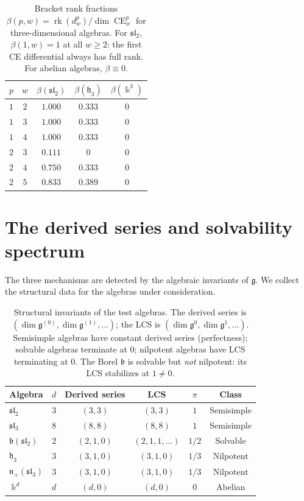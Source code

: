 \documentclass[11pt,reqno]{amsart}
\theoremstyle{plain}
\theoremstyle{definition}
\theoremstyle{remark}
\DeclareMathOperator{\CE}{CE}
\DeclareMathOperator{\rk}{rk}
\newcommand{\fg}{\mathfrak{g}}
\newcommand{\fh}{\mathfrak{h}}
\newcommand{\fn}{\mathfrak{n}}
\newcommand{\fb}{\mathfrak{b}}
\newcommand{\kk}{\Bbbk}
\begin{document}
\begin{table}[ht]
 \centering
 \begin{tabular}{cc|ccc}
 \toprule
 $p$ & $w$ & $\beta(\mathfrak{sl}_2)$ & $\beta(\fh_3)$ & $\beta(\kk^3)$ \\
 \midrule
 $1$ & $2$ & $1.000$ & $0.333$ & $0$ \\
 $1$ & $3$ & $1.000$ & $0.333$ & $0$ \\
 $1$ & $4$ & $1.000$ & $0.333$ & $0$ \\
 $2$ & $3$ & $0.111$ & $0$ & $0$ \\
 $2$ & $4$ & $0.750$ & $0.333$ & $0$ \\
 $2$ & $5$ & $0.833$ & $0.389$ & $0$ \\
 \bottomrule
 \end{tabular}
 \caption{Bracket rank fractions $\beta(p, w) = \rk(d^p_w)/\dim \CE^p_w$ for
 three-dimensional algebras. For $\mathfrak{sl}_2$, $\beta(1, w) = 1$ at
 all $w \ge 2$: the first CE differential always has full rank. For
 abelian algebras, $\beta \equiv 0$.}
 \label{tab:rank-fractions}
\end{table}


\section{The derived series and solvability spectrum}
\label{sec:derived}

The three mechanisms are detected by the algebraic invariants of $\fg$. We
collect the structural data for the algebras under consideration.

\begin{table}[ht]
 \centering
 \begin{tabular}{lccccc}
 \toprule
 Algebra & $d$ & Derived series & LCS & $\pi$ & Class \\
 \midrule
 $\mathfrak{sl}_2$ & $3$ & $(3, 3)$ & $(3, 3)$ & $1$ & Semisimple \\
 $\mathfrak{sl}_3$ & $8$ & $(8, 8)$ & $(8, 8)$ & $1$ & Semisimple \\
 $\fb(\mathfrak{sl}_2)$ & $2$ & $(2, 1, 0)$ & $(2, 1, 1, \ldots)$ & $1/2$
 & Solvable \\
 $\fh_3$ & $3$ & $(3, 1, 0)$ & $(3, 1, 0)$ & $1/3$ & Nilpotent \\
 $\fn_+(\mathfrak{sl}_3)$ & $3$ & $(3, 1, 0)$ & $(3, 1, 0)$ & $1/3$ &
 Nilpotent \\
 $\kk^d$ & $d$ & $(d, 0)$ & $(d, 0)$ & $0$ & Abelian \\
 \bottomrule
 \end{tabular}
 \caption{Structural invariants of the test algebras. The derived series
 is $(\dim \fg^{(0)}, \dim \fg^{(1)}, \ldots)$; the LCS is
 $(\dim \fg^0, \dim \fg^1, \ldots)$. Semisimple algebras have constant
 derived series (perfectness); solvable algebras terminate at $0$;
 nilpotent algebras have LCS terminating at $0$. The Borel $\fb$ is
 solvable but \emph{not} nilpotent: its LCS stabilizes at $1 \neq 0$.}
 \label{tab:derived}
\end{table}
\end{document}
